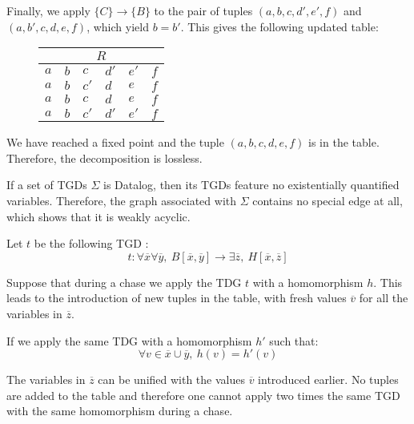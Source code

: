 \documentclass{../../cs-classes/cs-classes}
\begin{document}
\begin{exercise}
    Finally, we apply $\{C\} \rightarrow \{B\}$ to the pair of tuples $(a, b, c, d', e', f)$
    and $(a, b', c, d, e, f)$, which yield $b = b'$. This gives the following updated table:
    \begin{figure}[H]
        \centering
        \begin{tabular}{l l l l l l}
            \multicolumn{6}{c}{$R$}              \\
            \midrule
            $a$ & $b$ & $c$  & $d'$ & $e'$ & $f$ \\
            $a$ & $b$ & $c'$ & $d$  & $e$  & $f$ \\
            $a$ & $b$ & $c$  & $d$  & $e$  & $f$ \\
            $a$ & $b$ & $c'$ & $d'$ & $e'$ & $f$
        \end{tabular}
    \end{figure}
    We have reached a fixed point and the tuple $(a, b, c, d, e, f)$ is in the table.
    Therefore, the decomposition is lossless.
\end{exercise}

\begin{exercise}
    If a set of TGDs $\Sigma$ is Datalog, then its TGDs feature no existentially quantified variables. Therefore, the graph associated with $\Sigma$ contains no special edge at all, which shows that it is weakly acyclic.
\end{exercise}

\begin{exercise}
    Let $t$ be the following TGD :
    \begin{equation*}
        t:\forall \overline{x} \forall \overline{y}, ~ B\left[\overline{x}, \overline{y}\right] \rightarrow \exists \overline{z}, ~H\left[\overline{x}, \overline{z}\right]
    \end{equation*}

    Suppose that during a chase we apply the TDG $t$ with a homomorphism $h$.
    This leads to the introduction of new tuples in the table, with fresh values
    $\overline{v}$ for all the variables in $\overline{z}$.

    If we apply the same TDG with a homomorphism $h'$ such that:
    \begin{equation*}
        \forall v \in \overline{x} \cup \overline{y},~ h(v) = h'(v)
    \end{equation*}

    The variables in $\overline{z}$ can be unified with the values $\overline{v}$
    introduced earlier. No tuples are added to the table and therefore one cannot
    apply two times the same TGD with the same homomorphism during a chase.
\end{exercise}
\end{document}
